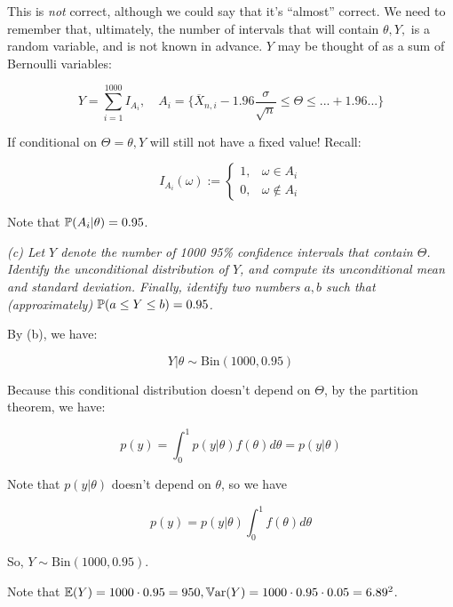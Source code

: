 \documentclass[a4paper]{article}
\begin{document}
                This is \textit{not} correct, although we could say that it's
                ``almost'' correct. We need to remember that, ultimately, the
                number of intervals that will contain $\theta, Y,$ is a random
                variable, and is not known in advance. $Y$ may be thought of as
                a sum of Bernoulli variables:

                \[
                    Y = \sum_{i=1}^{1000} I_{A_i}, \quad A_i =\{\overline
                    X_{n,i} - 1.96 \frac{\sigma}{\sqrt{n}} \leq \Theta \leq ...
                    + 1.96 ... \}
                \]

                If conditional on $\Theta = \theta, Y$ will still not have a
                fixed value! Recall:

                \[
                    I_{A_i}(\omega) := \begin{cases}1, & \omega \in A_i \\ 0, &
                    \omega \not \in A_i\end{cases}
                \]

                Note that $\mathbb{P}(A_i | \theta) = 0.95$.

            \textit{(c) Let $Y$ denote the number of 1000 95\% confidence
            intervals that contain $\Theta$. Identify the unconditional
            distribution of $Y$, and compute its unconditional mean and standard
            deviation. Finally, identify two numbers $a, b$ such that
            (approximately) $\mathbb{P}(a \leq Y \leq b) = 0.95$.}

                By (b), we have:

                \[
                    Y | \theta \sim \text{Bin}(1000, 0.95)
                \]

                Because this conditional distribution doesn't depend on
                $\Theta$, by the partition theorem, we have:

                \[
                    p(y) = \int_0^1 p(y | \theta) f(\theta) d\theta =
                    p(y | \theta)
                \]

                Note that $p(y | \theta)$ doesn't depend on $\theta$, so we have

                \[
                    p(y) = p(y | \theta) \int_0^1 f(\theta) d\theta
                \]

                So, $Y \sim \text{Bin}(1000, 0.95)$.

                Note that $\mathbb{E}(Y) = 1000 \cdot 0.95 = 950, \mathbb{V}\text{ar}(Y) = 1000 \cdot
                0.95 \cdot 0.05 = 6.89^2$.
\end{document}
